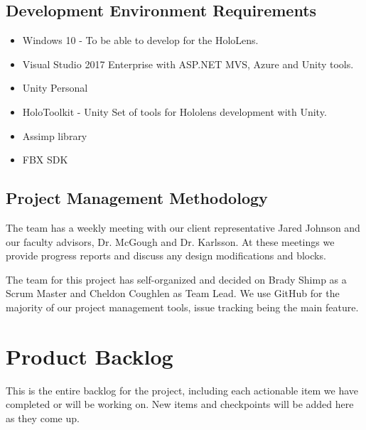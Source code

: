 \subsection{Development Environment Requirements}
\begin{itemize}
	\item Windows 10 - To be able to develop for the HoloLens.
	\item Visual Studio 2017 Enterprise with ASP.NET MVS, Azure and Unity tools.
	\item Unity Personal
	\item HoloToolkit - Unity Set of tools for Hololens development with Unity.
	\item Assimp library
	\item FBX SDK
\end{itemize}


\subsection{Project Management Methodology}
The team has a weekly meeting with our client representative Jared Johnson and 
our faculty advisors, Dr. McGough and Dr. Karlsson. At these meetings we provide
progress reports and discuss any design modifications and blocks.

The team for this project has self-organized and decided on Brady Shimp as a
Scrum Master and Cheldon Coughlen as Team Lead. We use GitHub for the majority 
of our project management tools, issue tracking being the main feature.





\section{Product Backlog}


This is the entire backlog for the project, including each actionable item we 
have completed or will be working on. New items and checkpoints will be added 
here as they come up.

